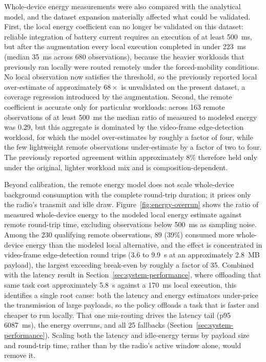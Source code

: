 Whole-device energy measurements were also compared with the analytical model,
and the dataset expansion materially affected what could be validated. First, the
local energy coefficient can no longer be validated on this dataset: reliable
integration of battery current requires an execution of at least 500~ms, but
after the augmentation every local execution completed in under 223~ms (median
35~ms across 680 observations), because the heavier workloads that previously ran
locally were routed remotely under the forced-mobility conditions. No local
observation now satisfies the threshold, so the previously reported local
over-estimate of approximately $68\times$ is unvalidated on the present dataset,
a coverage regression introduced by the augmentation. Second, the remote
coefficient is accurate only for particular workloads: across 163 remote
observations of at least 500~ms the median ratio of measured to modeled energy
was 0.29, but this aggregate is dominated by the video-frame edge-detection
workload, for which the model over-estimates by roughly a factor of four, while
the few lightweight remote observations under-estimate by a factor of two to
four. The previously reported agreement within approximately 8\% therefore held
only under the original, lighter workload mix and is composition-dependent.

Beyond calibration, the remote energy model does not scale whole-device
background consumption with the complete round-trip duration; it prices only the
radio's transmit and idle draw. Figure~\ref{fig:energy-overrun} shows the ratio
of measured whole-device energy to the modeled local energy estimate against
remote round-trip time, excluding observations below 500~ms as sampling noise.
Among the 230 qualifying remote observations, 89 (39\%) consumed more whole-device
energy than the modeled local alternative, and the effect is concentrated in
video-frame edge-detection round trips (3.6 to 9.9~s at an approximately 2.8~MB
payload), the largest exceeding break-even by roughly a factor of 35. Combined
with the latency result in Section~\ref{sec:system-performance}, where offloading
that same task cost approximately 5.8~s against a 170~ms local execution, this
identifies a single root cause: both the latency and energy estimators under-price
the transmission of large payloads, so the policy offloads a task that is faster
and cheaper to run locally. That one mis-routing drives the latency tail (p95
6087~ms), the energy overruns, and all 25 fallbacks
(Section~\ref{sec:system-performance}). Scaling both the latency and idle-energy
terms by payload size and round-trip time, rather than by the radio's active
window alone, would remove it.

